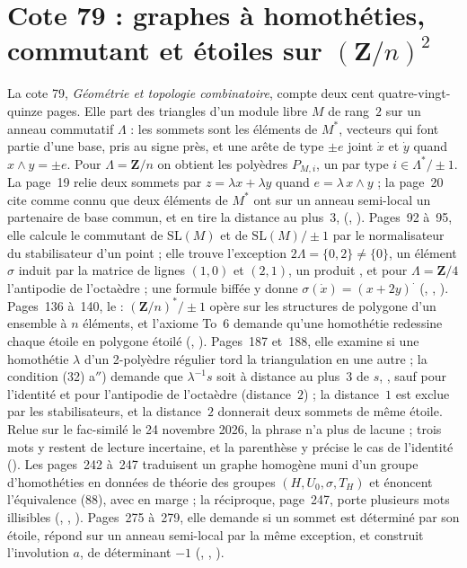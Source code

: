 \section[Cote 79 : graphes à homothéties, commutant et étoiles sur $(\mathbf Z/n)^2$]{Cote 79 : graphes à homothéties, commutant et étoiles sur $(\mathbf Z/n)^2$\protect{}}\label{sec:79}

La cote 79, \emph{Géométrie et topologie combinatoire}, compte deux cent quatre-vingt-quinze pages. Elle part des triangles d'un module libre $M$ de rang~$2$ sur un anneau commutatif $\Lambda$ : les sommets sont les éléments de $M^*$, vecteurs qui font partie d'une base, pris au signe près, et une arête de type $\pm e$ joint $\dot x$ et $\dot y$ quand $x \wedge y = \pm e$. Pour $\Lambda = \mathbf Z/n$ on obtient les polyèdres $P_{M, i}$, un par type $i \in \Lambda^*/\pm 1$. La page~19 relie deux sommets par $z = \lambda x + \lambda y$ quand $e = \lambda\, x \wedge y$ ; la page~20 cite comme connu que deux éléments de $M^*$ ont sur un anneau semi-local un partenaire de base commun, et en tire la distance au plus~$3$,  (, ). Pages~92 à~95, elle calcule le commutant de $\mathrm{SL}(M)$ et de $\mathrm{SL}(M)/\pm 1$ par le normalisateur du stabilisateur d'un point ; elle trouve l'exception $2\Lambda = \{0, 2\} \neq \{0\}$, un élément $\sigma$ induit par la matrice de lignes $(1, 0)$ et $(2, 1)$, un produit , et pour $\Lambda = \mathbf Z/4$ l'antipodie de l'octaèdre ; une formule biffée y donne $\sigma(\dot x) = (x + 2y)^{\cdot}$ (, , ). Pages~136 à~140, le  : $(\mathbf Z/n)^*/\pm 1$ opère sur les structures de polygone d'un ensemble à $n$ éléments, et l'axiome To~6 demande qu'une homothétie redessine chaque étoile en polygone étoilé (, ). Pages~187 et~188, elle examine si une homothétie $\lambda$ d'un 2-polyèdre régulier tord la triangulation en une autre ; la condition (32) a$''$) demande que $\lambda^{-1}s$ soit à distance au plus~$3$ de $s$, , sauf pour l'identité et pour l'antipodie de l'octaèdre (distance~$2$) ; la distance~$1$ est exclue par les stabilisateurs, et la distance~$2$ donnerait deux sommets de même étoile. Relue sur le fac-similé le 24 novembre 2026, la phrase n'a plus de lacune ; trois mots y restent de lecture incertaine, et la parenthèse  y précise le cas de l'identité (). Les pages~242 à~247 traduisent un graphe homogène muni d'un groupe d'homothéties en données de théorie des groupes $(H, U_0, \sigma, T_H)$ et énoncent l'équivalence (88), avec en marge  ; la réciproque, page~247, porte plusieurs mots illisibles (, , ). Pages~275 à~279, elle demande si un sommet est déterminé par son étoile, répond sur un anneau semi-local par la même exception, et construit l'involution $a$, de déterminant $-1$ (, , ).

